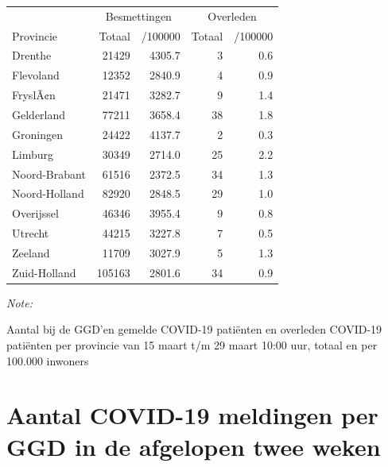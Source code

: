 \documentclass[
  english,
  man,floatsintext]{apa6}
\begin{document}
\begin{table}
\centering
\begin{threeparttable}
\begin{tabular}{lrrrr}
\toprule
\multicolumn{1}{c}{ } & \multicolumn{2}{c}{Besmettingen} & \multicolumn{2}{c}{Overleden} \\
\cmidrule(l{3pt}r{3pt}){2-3} \cmidrule(l{3pt}r{3pt}){4-5}
Provincie & Totaal & /100000 & Totaal & /100000\\
\midrule
Drenthe & 21429 & 4305.7 & 3 & 0.6\\
Flevoland & 12352 & 2840.9 & 4 & 0.9\\
FryslÃ¢n & 21471 & 3282.7 & 9 & 1.4\\
Gelderland & 77211 & 3658.4 & 38 & 1.8\\
Groningen & 24422 & 4137.7 & 2 & 0.3\\
Limburg & 30349 & 2714.0 & 25 & 2.2\\
Noord-Brabant & 61516 & 2372.5 & 34 & 1.3\\
Noord-Holland & 82920 & 2848.5 & 29 & 1.0\\
Overijssel & 46346 & 3955.4 & 9 & 0.8\\
Utrecht & 44215 & 3227.8 & 7 & 0.5\\
Zeeland & 11709 & 3027.9 & 5 & 1.3\\
Zuid-Holland & 105163 & 2801.6 & 34 & 0.9\\
\bottomrule
\end{tabular}
\begin{tablenotes}
\item \textit{Note: } 
\item Aantal bij de GGD’en gemelde COVID-19 patiënten en overleden COVID-19 patiënten per provincie van 15 maart t/m 29 maart 10:00 uur, totaal en per 100.000 inwoners
\end{tablenotes}
\end{threeparttable}
\end{table}

\newpage

\hypertarget{aantal-covid-19-meldingen-per-ggd-in-de-afgelopen-twee-weken}{%
\section{Aantal COVID-19 meldingen per GGD in de afgelopen twee weken}\label{aantal-covid-19-meldingen-per-ggd-in-de-afgelopen-twee-weken}}
\end{document}
